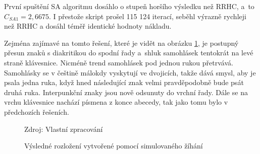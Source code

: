 \documentclass[a4paper, twoside, 12pt, czech]{article}
\begin{document}
První spuštění SA algoritmu dosáhlo o stupeň horšího výsledku než RRHC, a~to 
$C_{SA1}=2,6675$. I přestože skript prošel 115 124 iterací, seběhl výrazně
rychleji než RRHC a dosáhl téměř identické hodnoty nákladu.

Zejména zajímavé na tomto řešení, které je vidět na obrázku \ref{pic:sa}, je postupný přesun znaků s diakritikou do spodní 
řady a~shluk samohlásek tentokrát na levé straně klávesnice. Nicméně trend 
samohlásek pod jednou rukou přetrvává. Samohlásky se v češtině málokdy vyskytují 
ve dvojicích, takže dává smysl, aby je psala jedna ruka, když hned následující 
znak velmi pravděpodobně bude psát druhá ruka. Interpunkční znaky jsou nově 
odsunuty do vrchní řady. Dále se na vrchu klávesnice nachází písmena z konce 
abecedy, tak jako tomu bylo v předcho\-zích řešeních.

\begin{figure}[h]
    \centering
    \caption{Výsledné rozložení vytvořené pomocí simulovaného žíhání}
    \vspace{0.5cm}
    \begin{keyboardlayout}
                     
        \newrow
        
                     
        \newrow
        
                    
        \newrow
        
                   
        \newrow
        
               
    \end{keyboardlayout}
    \small{Zdroj: Vlastní zpracování}
    \label{pic:sa}
\end{figure}

\end{document}
